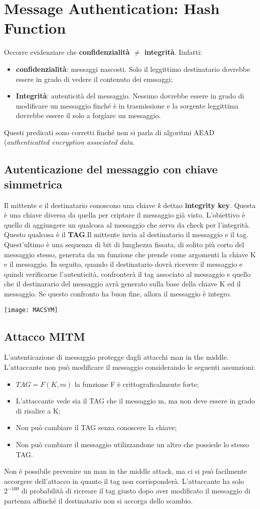 \documentclass{article}
\theoremstyle{remark}
\begin{document}
\section{Message Authentication: Hash Function}
Occorre evidenziare che \textbf{confidenzialità $\neq$ integrità}. Iinfatti:
\begin{itemize}
	\item \textbf{confidenzialità}: messaggi nascosti. Solo il leggittimo destinatario dovrebbe essere in grado di vedere il contenuto dei emssaggi;
	\item \textbf{Integrità}: autenticità del messaggio. Nessuno dovrebbe essere in grado di modificare un messaggio finché è in trasmissione e la sorgente leggittima dovrebbe essere il solo a forgiare un messaggio.
\end{itemize}
Questi predicati sono corretti finché non si parla di algoritmi AEAD (\emph{authenticatted encryption associated data}.
\subsection{Autenticazione del messaggio con chiave simmetrica}
Il mittente e il destinatario conoscono una chiave \emph{k} dettao \textbf{integrity key}. Questa è una chiave diversa da quella per criptare il messaggio già visto.
L'obiettivo è quello di aggiungere un qualcosa al messaggio che serva da check per l'integrità. Questo qualcosa è il \textbf{TAG}.Il mittente invia al destinatario il messaggio e il tag. Quest'ultimo è una sequenza di bit di lunghezza fissata, di solito più corto del messaggio stesso, generata da un funzione che prende come argomenti la chiave K e il messaggio. In seguito, quando il destinatario dovrà ricevere il messaggio e quindi verificarne l'autenticità, confronterà il tag associato al messaggio e quello che il destinarario del messaggio avrà generato sulla base della chiave K ed il messaggio. Se questo confronto ha buon fine, allora il messaggio è integro.
\begin{center}
	\texttt{[image: MACSYM]}
\end{center}
\subsection{Attacco MITM}
L'autenticazione di messaggio protegge dagli attacchi man in the middle. L'attaccante non può modificare il messaggio considerando le seguenti assunzioni:
\begin{itemize}
	\item $TAG=F(K,m)$ la funzione F è crittograficalmente forte;
	\item L'attaccante vede sia il TAG che il messaggio m, ma non deve essere in grado di risalire a K;
	\item Non può cambiare il TAG senza conoscere la chiave;
	\item Non può cambiare il messaggio utilizzandone un altro che possiede lo stesso TAG.
\end{itemize}
Non è possibile prevenire un man in the middle attack, ma ci si può facilmente accorgere dell'attacco in quanto il tag non corrisponderà. L'attaccante ha solo $2^{-100}$ di probabilità di ricreare il tag giusto dopo aver modificato il messaggio di partenza affinché il destinatario non si accorga dello scambio.
\end{document}
